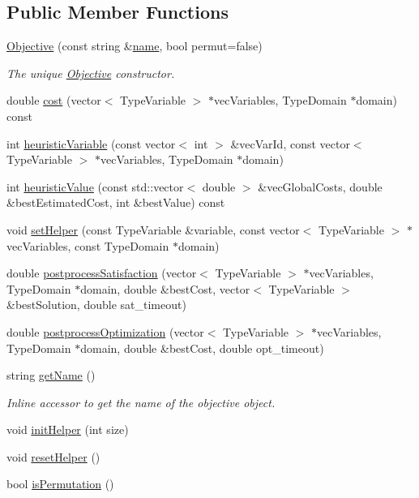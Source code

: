 \subsection*{Public Member Functions}
\begin{DoxyCompactItemize}
\item 
\hyperlink{classghost_1_1Objective_ae8f0c0e859244a5acf8e6f9a609b8e12}{Objective} (const string \&\hyperlink{classghost_1_1Objective_ae9533a52b3600c826df6e20c65db1e7a}{name}, bool permut=false)
\begin{DoxyCompactList}\small\item\em The unique \hyperlink{classghost_1_1Objective}{Objective} constructor. \end{DoxyCompactList}\item 
double \hyperlink{classghost_1_1Objective_a8ac8effdac4a09063fd680ed60b6a06f}{cost} (vector$<$ Type\-Variable $>$ $\ast$vec\-Variables, Type\-Domain $\ast$domain) const 
\item 
int \hyperlink{classghost_1_1Objective_af68c07a226162ea7f9ee01a0b00d3ae4}{heuristic\-Variable} (const vector$<$ int $>$ \&vec\-Var\-Id, const vector$<$ Type\-Variable $>$ $\ast$vec\-Variables, Type\-Domain $\ast$domain)
\item 
int \hyperlink{classghost_1_1Objective_ac9d6c8e05cca99cd797d302b3755b6b5}{heuristic\-Value} (const std\-::vector$<$ double $>$ \&vec\-Global\-Costs, double \&best\-Estimated\-Cost, int \&best\-Value) const 
\item 
void \hyperlink{classghost_1_1Objective_ab589c264cf391bab9005562f66a39797}{set\-Helper} (const Type\-Variable \&variable, const vector$<$ Type\-Variable $>$ $\ast$vec\-Variables, const Type\-Domain $\ast$domain)
\item 
double \hyperlink{classghost_1_1Objective_aa79835aa61f6680e78912ecaee6f7fbc}{postprocess\-Satisfaction} (vector$<$ Type\-Variable $>$ $\ast$vec\-Variables, Type\-Domain $\ast$domain, double \&best\-Cost, vector$<$ Type\-Variable $>$ \&best\-Solution, double sat\-\_\-timeout)
\item 
double \hyperlink{classghost_1_1Objective_adbaff57012dd756d87dc5151d9718296}{postprocess\-Optimization} (vector$<$ Type\-Variable $>$ $\ast$vec\-Variables, Type\-Domain $\ast$domain, double \&best\-Cost, double opt\-\_\-timeout)
\item 
string \hyperlink{classghost_1_1Objective_adfe2130d5a472771544a4033e457c4bb}{get\-Name} ()
\begin{DoxyCompactList}\small\item\em Inline accessor to get the name of the objective object. \end{DoxyCompactList}\item 
void \hyperlink{classghost_1_1Objective_ad4432d190d227f7e67bd505f0b4b80e9}{init\-Helper} (int size)
\item 
void \hyperlink{classghost_1_1Objective_a76ca30dd5fc977963058f0c3abfe100a}{reset\-Helper} ()
\item 
bool \hyperlink{classghost_1_1Objective_a558991ad856cff48262e2848c6ab5796}{is\-Permutation} ()
\end{DoxyCompactItemize}

